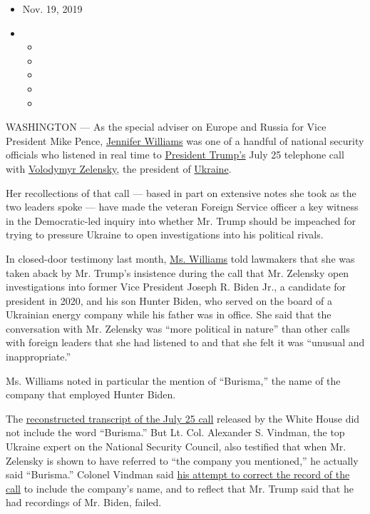 \begin{itemize}
\item
  Nov. 19, 2019
\item
  \begin{itemize}
  \item
  \item
  \item
  \item
  \item
  \end{itemize}
\end{itemize}

WASHINGTON --- As the special adviser on Europe and Russia for Vice
President Mike Pence,
\href{https://www.nytimes.com/2019/11/19/us/politics/impeachment-hearings.html}{Jennifer
Williams} was one of a handful of national security officials who
listened in real time to
\href{https://www.nytimes.com/2019/11/19/us/politics/impeachment-hearings.html}{President
Trump's} July 25 telephone call with
\href{https://www.nytimes.com/2019/11/19/us/politics/impeachment-hearings.html}{Volodymyr
Zelensky}, the president of
\href{https://www.nytimes.com/2019/11/19/us/politics/impeachment-hearings.html}{Ukraine}.

Her recollections of that call --- based in part on extensive notes she
took as the two leaders spoke --- have made the veteran Foreign Service
officer a key witness in the Democratic-led inquiry into whether Mr.
Trump should be impeached for trying to pressure Ukraine to open
investigations into his political rivals.

In closed-door testimony last month,
\href{https://www.nytimes.com/2019/11/19/us/politics/impeachment-hearings.html}{Ms.
Williams} told lawmakers that she was taken aback by Mr. Trump's
insistence during the call that Mr. Zelensky open investigations into
former Vice President Joseph R. Biden Jr., a candidate for president in
2020, and his son Hunter Biden, who served on the board of a Ukrainian
energy company while his father was in office. She said that the
conversation with Mr. Zelensky was ``more political in nature'' than
other calls with foreign leaders that she had listened to and that she
felt it was ``unusual and inappropriate.''

Ms. Williams noted in particular the mention of ``Burisma,'' the name of
the company that employed Hunter Biden.

The
\href{https://www.nytimes.com/interactive/2019/09/25/us/politics/trump-ukraine-transcript.html}{reconstructed
transcript of the July 25 call} released by the White House did not
include the word ``Burisma.'' But Lt. Col. Alexander S. Vindman, the top
Ukraine expert on the National Security Council, also testified that
when Mr. Zelensky is shown to have referred to ``the company you
mentioned,'' he actually said ``Burisma.'' Colonel Vindman said
\href{https://www.nytimes.com/2019/10/29/us/politics/alexander-vindman-trump-ukraine.html}{his
attempt to correct the record of the call} to include the company's
name, and to reflect that Mr. Trump said that he had recordings of Mr.
Biden, failed.

